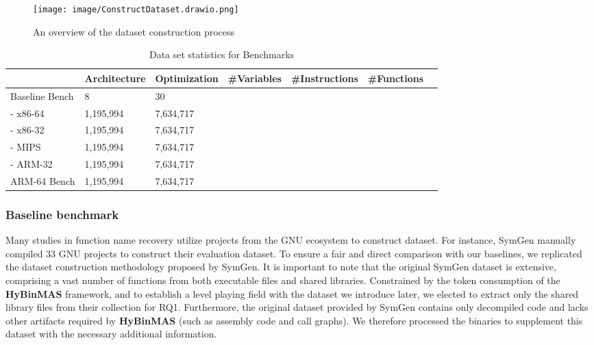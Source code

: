 \documentclass[acmsmall,screen,review,anonymous]{acmart} %
\begin{document}
\begin{figure}[t] %
    \centering
    \texttt{[image: image/ConstructDataset.drawio.png]} %
    \caption{An overview of the dataset construction process} %
    \label{fig:construct-dataset} %
\end{figure}


\renewcommand\arraystretch{1.31}
\begin{table}[tb]
  \centering
  \footnotesize
  \caption{Data set statistics for Benchmarks}\label{table:data}
    \begin{tabular}{p{2.5cm}p{1.6cm}p{1.6cm}p{1.6cm}p{1.6cm}p{1.6cm}p{1.6cm}}
   \toprule
     & Architecture & Optimization & \#Variables & \#Instructions &\#Functions\\
    \hline
    Baseline Bench  & 8 & 30\\
    - x86-64 &1,195,994 & 7,634,717\\
    - x86-32 &1,195,994 & 7,634,717\\
    - MIPS &1,195,994 & 7,634,717\\
    - ARM-32 &1,195,994 & 7,634,717\\
    ARM-64 Bench  &1,195,994 & 7,634,717\\
    \bottomrule
  \end{tabular}
  \vspace{-0.2in}
\end{table}
\renewcommand\arraystretch{1.0}


\subsubsection{Baseline benchmark}
Many studies in function name recovery utilize projects from the GNU ecosystem to construct dataset. For instance, SymGen\cite{SymGen} manually compiled 33 GNU projects to construct their evaluation dataset. To ensure a fair and direct comparison with our baselines, we replicated the dataset construction methodology proposed by SymGen. It is important to note that the original SymGen dataset is extensive, comprising a vast number of functions from both executable files and shared libraries. Constrained by the token consumption of the \textbf{HyBinMAS} framework, and to establish a level playing field with the dataset we introduce later, we elected to extract only the shared library files from their collection for RQ1. Furthermore, the original dataset provided by SymGen contains only decompiled code and lacks other artifacts required by \textbf{HyBinMAS} (such as assembly code and call graphs). We therefore processed the binaries to supplement this dataset with the necessary additional information. %
\end{document}
